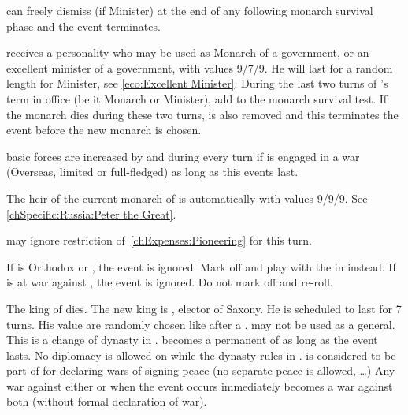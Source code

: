 \aparag \HOL can freely dismiss  (if Minister) at the
end of any following monarch survival phase and the event terminates.

\phevnt
\aparag \HOL receives a personality  who may be used as
Monarch of a  government, or an excellent minister of a
 government, with values 9/7/9.  He will last for a random
length for Minister, see \ref{eco:Excellent Minister}.
\aparag During the last two turns of 's term in office (be
it Monarch or Minister), add  to the monarch survival test.  If the
monarch dies during these two turns,  is also removed and
this terminates the event before the new monarch is chosen.

\phadm
\aparag \HOL basic forces are increased by \FLEET\facemoins and \ARMY\faceplus
during every turn if is engaged in a war (Overseas, limited or full-fledged)
as long as this events last.






\phevnt
\aparag The heir of the current monarch of \RUS is automatically
 with values 9/9/9. See \ref{chSpecific:Russia:Peter
  the Great}.

\phadm
\aparag \RUS may ignore restriction of~\ref{chExpenses:Pioneering} for this
turn.





\condition{}
\aparag If \POL is Orthodox or \CATHCR, the event is ignored. Mark off and
play \RD with the \REVOLT in \POL instead.
\aparag If \POL is at war against \paysSaxe, the event is ignored. Do not mark
off and re-roll.

\phevnt
\aparag The king of \POL dies. The new king is , elector
of Saxony.
\bparag He is scheduled to last for 7 turns.
\bparag His value are randomly chosen like after a .
\bparag {} may not be used as a general.
\bparag This is a change of dynasty in \POL.
\aparag \paysSaxe becomes a permanent \VASSAL of \POL as long as the event
lasts.
\bparag No diplomacy is allowed on \paysSaxe while the dynasty rules in \POL.
\bparag \paysSaxe is considered to be part of \POL for declaring wars of
signing peace (no separate peace is allowed, \ldots)
\aparag Any war against either \paysSaxe or \POL when the event occurs
immediately becomes a war against both (without formal declaration of war).

